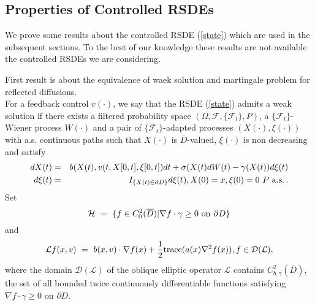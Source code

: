 \documentclass[11pt]{amsart}
\numberwithin{equation}{section}
\begin{document}
\subsection{Properties of Controlled RSDEs} We prove some results  about the controlled RSDE
(\ref{state}) which are used in the subsequent sections. To the best of our knowledge these results
are not available the controlled RSDEs we are considering. 

First result is about the equivalence of waek  solution and martingale problem for reflected diffusions. \\
For a feedback  control $v(\cdot)$, we say that the RSDE (\ref{state}) admits a weak solution if 
there exists a filtered probability space $(\Omega, {\mathcal F}, \{\mathcal{F}_t \}, P)$, a
$\{\mathcal {F}_t\}$-Wiener  process $W(\cdot)$ and a pair of $\{\mathcal {F}_t\}$-adapted 
processes $(X(\cdot), \xi(\cdot))$  with a.s. continuous paths such that $X(\cdot)$ is $\overline{D}$-valued,
$\xi(\cdot)$ is non decreasing and satisfy
\begin{eqnarray*}
d X(t) & = & b(X(t), v(t, X[0, t], \xi[0, t]) dt + \sigma(X(t) dW(t) - \gamma(X(t)) d \xi(t)\\
d \xi(t) & = & I_{\{ X(t) \in \partial D \}}d \xi(t), X(0) =x, \xi(0) =0 \ P \ {\rm a.s.} \, .
\end{eqnarray*}
Set
\begin{equation}\label{domain}
{\mathcal H} \ = \ \{ f \in C^2_0 (\overline{D}) | \nabla f \cdot \gamma \geq 0 \ {\rm on} \
\partial D \}
\end{equation}
and 
\begin{equation}\label{generator}
\mathcal{L} f(x, v) \ = \ b(x, v) \cdot \nabla f (x) + \frac{1}{2} {\rm trace}( a(x) \nabla^2 f (x)) ,
f \in \mathcal{D}(\mathcal{L}),
\end{equation}
where the domain $\mathcal{D}(\mathcal{L})$ of the oblique elliptic operator $\mathcal{L}$ 
contains $C^2_{b, \gamma}(\overline{D})$,
the set of all bounded twice continuously differentiable functions satisfying 
$\nabla f \cdot \gamma \geq 0$ on $\partial D$.\\
\end{document}
